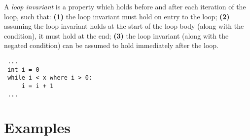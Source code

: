 \documentclass[a4paper,10pt,twcolumn]{article}
\begin{document}
A {\em loop invariant} is a property which holds before and after each
iteration of the loop, such that: {\bf (1)} the loop invariant must hold on
entry to the loop; {\bf (2)} assuming the loop invariant holds at the start of
the loop body (along with the condition), it must hold at the end; {\bf (3)}
the loop invariant (along with the negated condition) can be assumed
to hold immediately after the loop.
\begin{lstlisting}
 ...
 int i = 0
 while i < x where i > 0:
     i = i + 1 
 ...
\end{lstlisting}


\section*{Examples}
\end{document}
